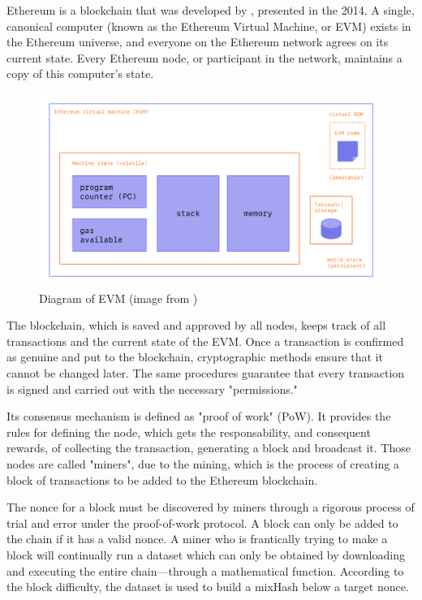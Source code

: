 Ethereum is a blockchain that was developed by \citet{Ethereum}, presented in the 2014. 
A single, canonical computer (known as the Ethereum Virtual Machine, or EVM) exists in the Ethereum universe, and everyone on the Ethereum network agrees on its current state.
Every Ethereum node, or participant in the network, maintains a copy of this computer's state.

\begin{figure}
    \centering
    \includegraphics[width=13cm]{logos/evm.png}
    \caption{Diagram of EVM (image from \cite{EthDocs})}
    \label{fig:evm}
\end{figure}


The blockchain, which is saved and approved by all nodes, keeps track of all transactions and the current state of the EVM. 
Once a transaction is confirmed as genuine and put to the blockchain, cryptographic methods ensure that it cannot be changed later.
The same procedures guarantee that every transaction is signed and carried out with the necessary "permissions." 

Its consensus mechanism is defined as "proof of work" (PoW). 
It provides the rules for defining the node, which gets the responsability, and consequent rewards, of collecting the 
transaction, generating a block and broadcast it. 
Those nodes are called "miners", due to the mining, which is the process of creating a block of transactions to be added to the Ethereum blockchain. 

The nonce for a block must be discovered by miners through a rigorous process of trial and error under the proof-of-work protocol.
A block can only be added to the chain if it has a valid nonce. 
A miner who is frantically trying to make a block will continually run a dataset which can only be obtained by downloading and executing the entire chain—through a mathematical function.
According to the block difficulty, the dataset is used to build a mixHash below a target nonce.

